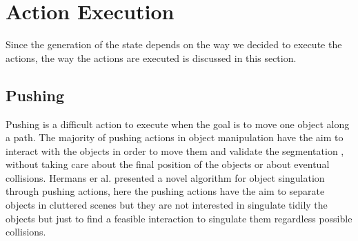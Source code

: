 


\section{Action Execution}
Since the generation of the state depends on the way we decided to execute the actions, the way the actions are executed is discussed in this section.   

\subsection{Pushing}
\label{subsec:pushing}

Pushing is a difficult action to execute when the goal is to move one object along a path. The majority of pushing actions in object manipulation have the aim to interact with the objects in order to move them and validate the segmentation \citep{katz2014perceiving} \citep{katz2011interactive} \citep{Katz_2013_7407} , without taking care about the final position of the objects or about eventual collisions. Hermans er al. \citep{conf/iros/HermansRB12} presented a novel algorithm for object singulation through pushing actions, here the pushing actions have the aim to separate objects in cluttered scenes but they are not interested in singulate tidily the objects but just to find a feasible interaction to singulate them regardless possible collisions. 



